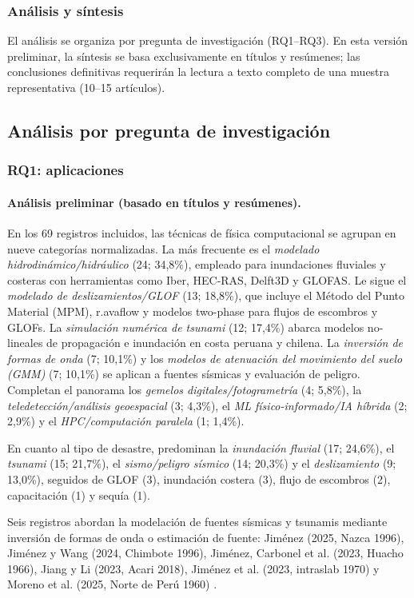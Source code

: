 \documentclass[12pt,a4paper]{article}
\begin{document}
\subsubsection{Análisis y síntesis}
El análisis se organiza por pregunta de investigación (RQ1--RQ3). En esta versión preliminar, la síntesis se basa exclusivamente en títulos y resúmenes; las conclusiones definitivas requerirán la lectura a texto completo de una muestra representativa (10--15 artículos).

\subsection{Análisis por pregunta de investigación}
\subsubsection{RQ1: aplicaciones}
\label{sec:rq1}
\paragraph*{Análisis preliminar (basado en títulos y resúmenes).}
En los 69 registros incluidos, las técnicas de física computacional se agrupan en nueve categorías normalizadas. La más frecuente es el \textit{modelado hidrodinámico/hidráulico} (24; 34,8\%), empleado para inundaciones fluviales y costeras con herramientas como Iber, HEC-RAS, Delft3D y GLOFAS. Le sigue el \textit{modelado de deslizamientos/GLOF} (13; 18,8\%), que incluye el Método del Punto Material (MPM), r.avaflow y modelos two-phase para flujos de escombros y GLOFs. La \textit{simulación numérica de tsunami} (12; 17,4\%) abarca modelos no-lineales de propagación e inundación en costa peruana y chilena. La \textit{inversión de formas de onda} (7; 10,1\%) y los \textit{modelos de atenuación del movimiento del suelo (GMM)} (7; 10,1\%) se aplican a fuentes sísmicas y evaluación de peligro. Completan el panorama los \textit{gemelos digitales/fotogrametría} (4; 5,8\%), la \textit{teledetección/análisis geoespacial} (3; 4,3\%), el \textit{ML físico-informado/IA híbrida} (2; 2,9\%) y el \textit{HPC/computación paralela} (1; 1,4\%).

En cuanto al tipo de desastre, predominan la \textit{inundación fluvial} (17; 24,6\%), el \textit{tsunami} (15; 21,7\%), el \textit{sismo/peligro sísmico} (14; 20,3\%) y el \textit{deslizamiento} (9; 13,0\%), seguidos de GLOF (3), inundación costera (3), flujo de escombros (2), capacitación (1) y sequía (1).

Seis registros abordan la modelación de fuentes sísmicas y tsunamis mediante inversión de formas de onda o estimación de fuente: Jiménez (2025, Nazca 1996), Jiménez y Wang (2024, Chimbote 1996), Jiménez, Carbonel et al. (2023, Huacho 1966), Jiang y Li (2023, Acari 2018), Jiménez et al. (2023, intraslab 1970) y Moreno et al. (2025, Norte de Perú 1960) \parencite{jimenez2025numerical, jimenez2024numerical, jimnez2023seismic, jiang2023estimation, jimnez2023numerical, moreno2025tsunami}.
\end{document}

